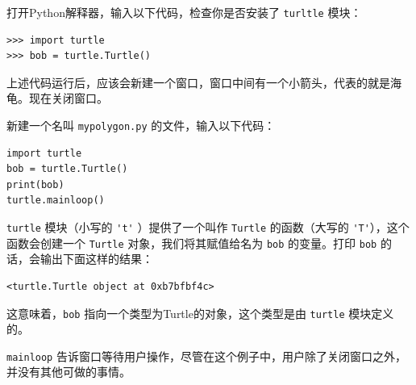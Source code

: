 打开Python解释器，输入以下代码，检查你是否安装了 \lstinline{turltle} 模块：

\begin{lstlisting}
>>> import turtle
>>> bob = turtle.Turtle()
\end{lstlisting}


上述代码运行后，应该会新建一个窗口，窗口中间有一个小箭头，代表的就是海龟。现在关闭窗口。


新建一个名叫  \lstinline{mypolygon.py} 的文件，输入以下代码：

\begin{lstlisting}
import turtle
bob = turtle.Turtle()
print(bob)
turtle.mainloop()
\end{lstlisting}


\lstinline{turtle} 模块（小写的 \lstinline{'t'} ）提供了一个叫作 \lstinline{Turtle} 的函数（大写的 \lstinline{'T'}），这个函数会创建一个 \lstinline{Turtle} 对象，我们将其赋值给名为 \lstinline{bob} 的变量。打印 \lstinline{bob} 的话，会输出下面这样的结果：

\begin{lstlisting}
<turtle.Turtle object at 0xb7bfbf4c>
\end{lstlisting}


这意味着，\lstinline{bob} 指向一个类型为Turtle的对象，这个类型是由 \lstinline{turtle} 模块定义的。


\lstinline{mainloop} 告诉窗口等待用户操作，尽管在这个例子中，用户除了关闭窗口之外，并没有其他可做的事情。


